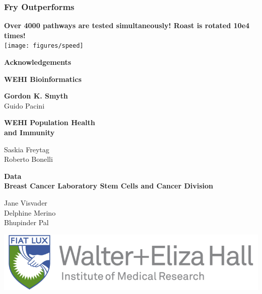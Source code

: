 \documentclass[9pt,t]{beamer}
\begin{document}
\begin{frame}
\frametitle{Fry Outperforms}
\vfill
\large\textbf{\color{oxygenpurple}Over 4000 pathways are tested simultaneously! Roast is rotated 10e4 times!}\\
\vfill
\texttt{[image: figures/speed]}
\end{frame}

\begin{frame}[plain,t]
	\vspace{0.7cm}
	\textbf{\huge{Acknowledgements}}\\
	\vspace{1cm}
	
	\begin{minipage}[t]{0.49\textwidth}
	{\color{oxygenpurple}\textbf{WEHI Bioinformatics}}\\
	\vspace{0.20cm}
	
	\textbf{Gordon K. Smyth}\\
	Guido Pacini\\
	\vspace{0.35cm}
	
	{\color{oxygenpurple}\textbf{WEHI Population Health \\and Immunity}}\\
	\vspace{0.20cm}
	
	Saskia Freytag\\
	Roberto Bonelli\\
	\vspace{0.7cm}
	\end{minipage}%
	\begin{minipage}[t]{0.49\textwidth}
	{\color{oxygenpurple}\textbf{Data}}\\	
	{\color{oxygenrose}\textbf{Breast Cancer Laboratory Stem Cells and Cancer Division}}\\
	\vspace{0.20cm}
	
	Jane Visvader\\
	Delphine Merino\\
	Bhupinder Pal
	\vspace{0.75cm}
	
	\includegraphics[width=1\textwidth]{WEHI}
	\vspace{1.35cm}
	
	
	\end{minipage}
\end{frame}

\end{document}
